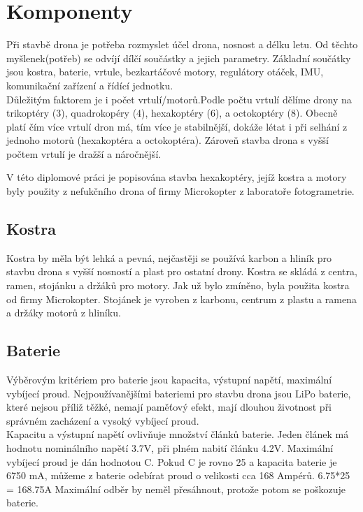 \chapter{Komponenty}
\label{3-soucastky}

Při stavbě drona je potřeba rozmyslet účel drona, nosnost a délku letu. Od těchto myšlenek(potřeb) se odvíjí dílčí součástky a jejich parametry. Základní součátky jsou kostra, baterie, vrtule, bezkartáčové motory, regulátory otáček, IMU, komunikační zařízení a řídící jednotku.\\ Důležitým faktorem je i počet vrtulí/motorů.Podle počtu vrtulí dělíme drony na trikoptéry (3), quadrokopéry (4), hexakoptéry (6), a octokoptéry (8). Obecně platí čím více vrtulí dron má, tím více je stabilnější, dokáže létat i při selhání z jednoho motorů (hexakoptéra a octokoptéra). Zároveň stavba drona s vyšší počtem vrtulí je dražší a náročnější.

V této diplomové práci je popisována stavba hexakoptéry, jejíž kostra a motory byly použity z nefukčního drona of firmy Microkopter z laboratoře fotogrametrie.

\section{Kostra} 
Kostra by měla být lehká a pevná, nejčastěji se používá karbon a hliník pro stavbu drona s vyšší nosností a plast pro ostatní drony. Kostra se skládá z centra, ramen, stojánku a držáků pro motory.
Jak už bylo zmíněno, byla použita kostra od firmy Microkopter. Stojánek je vyroben z karbonu, centrum z plastu a ramena a držáky motorů z hliníku.

\section{Baterie} 
Výběrovým kritériem pro baterie jsou kapacita, výstupní napětí, maximální vybíjecí proud.
Nejpoužívanějšími bateriemi pro stavbu drona jsou LiPo baterie, které nejsou příliž těžké, nemají paměťový efekt, mají dlouhou životnost při správném zacházení a vysoký vybíjecí proud.\\
Kapacitu a výstupní napětí ovlivňuje množství článků baterie. 
Jeden článek má hodnotu nominálního napětí 3.7V, při plném nabití článku 4.2V. Maximální vybíjecí proud je dán hodnotou C. Pokud C je rovno 25 a kapacita baterie je 6750 mA, můžeme z baterie odebírat proud o velikosti cca 168 Ampérů. 6.75*25 = 168.75A
Maximální odběr by neměl přesáhnout, protože potom se poškozuje baterie.

